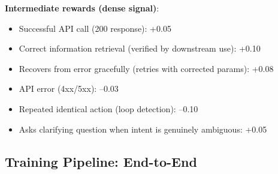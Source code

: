 \textbf{Intermediate rewards (dense signal)}:

\begin{itemize}
  \item Successful API call (200 response): +0.05
  \item Correct information retrieval (verified by downstream use): +0.10
  \item Recovers from error gracefully (retries with corrected params): +0.08
  \item API error (4xx/5xx): --0.03
  \item Repeated identical action (loop detection): --0.10
  \item Asks clarifying question when intent is genuinely ambiguous: +0.05
\end{itemize}

\subsection{Training Pipeline: End-to-End}
\label{training-pipeline-end-to-end}

